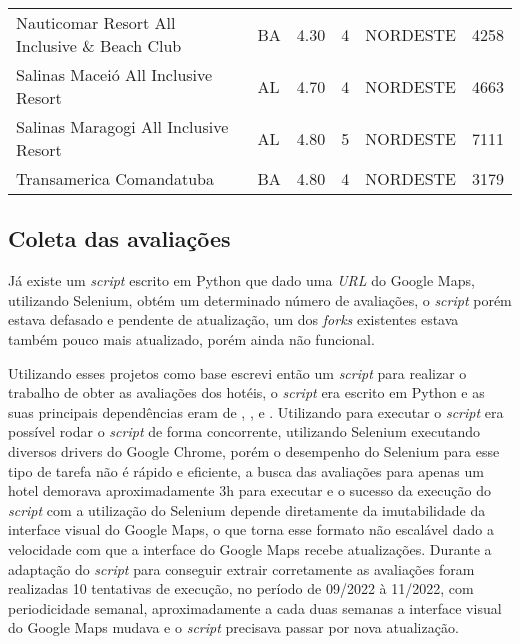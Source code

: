 \begin{table}[H]
{\begin{tabular}{llrrlr}
			Nauticomar Resort All Inclusive \& Beach Club & BA              & 4.30          & 4                 & NORDESTE        & 4258                       \\
			Salinas Maceió All Inclusive Resort           & AL              & 4.70          & 4                 & NORDESTE        & 4663                       \\
			Salinas Maragogi All Inclusive Resort         & AL              & 4.80          & 5                 & NORDESTE        & 7111                       \\
			Transamerica Comandatuba                      & BA              & 4.80          & 4                 & NORDESTE        & 3179
		\end{tabular}%
	}
\end{table}

\subsection{Coleta das avaliações}
\label{cap:metodologia:sec:conjunto_dados:sec:coleta}

Já existe um \emph{script} escrito em Python \cite{gaspa93scrapper2023} que dado uma \emph{URL} do Google Maps, utilizando Selenium, obtém um determinado número de avaliações, o \emph{script} porém estava defasado e pendente de atualização, um dos \emph{forks} existentes  estava também pouco mais atualizado, porém ainda não funcional.

Utilizando esses projetos como base escrevi então um \emph{script} para realizar o trabalho de obter as avaliações dos hotéis, o \emph{script} era escrito em Python e as suas principais dependências eram de \cite{selenium2023}, ,  e . Utilizando  para executar o \emph{script} era possível rodar o \emph{script} de forma concorrente, utilizando Selenium executando diversos drivers do Google Chrome, porém o desempenho do Selenium para esse tipo de tarefa não é rápido e eficiente, a busca das avaliações para apenas um hotel demorava aproximadamente 3h para executar e o sucesso da execução do \emph{script} com a utilização do Selenium depende diretamente da imutabilidade da interface visual do Google Maps, o que torna esse formato não escalável dado a velocidade com que a interface do Google Maps recebe atualizações. Durante a adaptação do \emph{script} para conseguir extrair corretamente as avaliações foram realizadas 10 tentativas de execução, no período de 09/2022 à 11/2022, com periodicidade semanal, aproximadamente a cada duas semanas a interface visual do Google Maps mudava e o \emph{script} precisava passar por nova atualização.

